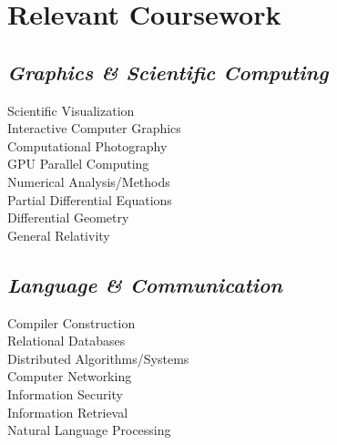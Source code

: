 \documentclass[11pt]{article}
\begin{document}
\begin{minipage}{250pt}
\section*{\sc Relevant Coursework}
\subsection*{\it Graphics \& Scientific Computing}
Scientific Visualization\\
Interactive Computer Graphics\\
Computational Photography\\
GPU Parallel Computing\\
Numerical Analysis/Methods\\
Partial Differential Equations\\
Differential Geometry\\
General Relativity

\subsection*{\it Language \& Communication}
Compiler Construction\\
Relational Databases\\
Distributed Algorithms/Systems\\
Computer Networking\\
Information Security\\
Information Retrieval\\
Natural Language Processing

\end{minipage}
\end{document}
